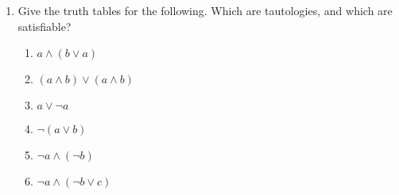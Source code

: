 \documentclass[basic, header]{nosvagor-notes}
\begin{document}
\begin{enumerate}[itemsep=2em]
  \item Give the truth tables for the following. Which are tautologies, and which
  are satisfiable?
  \begin{enumerate}
    \item \(a \land (b \lor a)\)
    \item \((a \land b) \lor (a \land b) \)

    \item \(a \lor \lnot a\)

    \item \(\lnot (a \lor b)\)

    \item \(\lnot a \land (\lnot b)\)

    \item \(\lnot a \land (\lnot b \lor c)\)

  \end{enumerate}

\end{enumerate}
\end{document}
